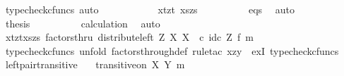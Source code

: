 \begin{isabellebody}
\ {\isacharparenleft}{\kern0pt}typecheck{\isacharunderscore}{\kern0pt}cfuncs{\isacharcomma}{\kern0pt}\ auto{\isacharparenright}{\kern0pt}\isanewline
\ \ \ \ \ \ \isamarkupfalse%
\ \isamarkupfalse%
\ {\isachardoublequoteopen}{\isachardot}{\kern0pt}{\isachardot}{\kern0pt}{\isachardot}{\kern0pt}\ {\isacharequal}{\kern0pt}\ {\isasymlangle}{\isasymlangle}xt{\isacharcomma}{\kern0pt}zt{\isasymrangle}{\isacharcomma}{\kern0pt}\ {\isasymlangle}xs{\isacharcomma}{\kern0pt}zs{\isasymrangle}{\isasymrangle}{\isachardoublequoteclose}\isanewline
\ \ \ \ \ \ \ \ \isamarkupfalse%
\ eqs\ \isamarkupfalse%
\ auto\isanewline
\ \ \ \ \ \ \isamarkupfalse%
\ \isamarkupfalse%
\ {\isacharquery}{\kern0pt}thesis\isanewline
\ \ \ \ \ \ \ \ \isamarkupfalse%
\ calculation\ \isamarkupfalse%
\ auto\isanewline
\ \ \ \ \isamarkupfalse%
\isanewline
\ \ \ \ \isamarkupfalse%
\ \isamarkupfalse%
\ {\isachardoublequoteopen}{\isasymlangle}{\isasymlangle}xt{\isacharcomma}{\kern0pt}zt{\isasymrangle}{\isacharcomma}{\kern0pt}{\isasymlangle}xs{\isacharcomma}{\kern0pt}zs{\isasymrangle}{\isasymrangle}\ factorsthru\ {\isacharparenleft}{\kern0pt}distribute{\isacharunderscore}{\kern0pt}left\ Z\ X\ X\ \ {\isasymcirc}\isactrlsub c\ {\isacharparenleft}{\kern0pt}id\isactrlsub c\ Z\ {\isasymtimes}\isactrlsub f\ m{\isacharparenright}{\kern0pt}{\isacharparenright}{\kern0pt}{\isachardoublequoteclose}\isanewline
\ \ \ \ \ \ \isamarkupfalse%
\ {\isacharparenleft}{\kern0pt}typecheck{\isacharunderscore}{\kern0pt}cfuncs{\isacharcomma}{\kern0pt}\ unfold\ factors{\isacharunderscore}{\kern0pt}through{\isacharunderscore}{\kern0pt}def{}{\isacharcomma}{\kern0pt}\ rule{\isacharunderscore}{\kern0pt}tac\ x{\isacharequal}{\kern0pt}{\isachardoublequoteopen}{\isasymlangle}z{\isacharcomma}{\kern0pt}y{\isacharprime}{\kern0pt}{\isasymrangle}{\isachardoublequoteclose}\ \ exI{\isacharcomma}{\kern0pt}\ typecheck{\isacharunderscore}{\kern0pt}cfuncs{\isacharparenright}{\kern0pt}\isanewline
\ \ \isamarkupfalse%
\isanewline
{}\isamarkupfalse%
%
\endisatagproof
{\isafoldproof}%
%
\isadelimproof
\isanewline
%
\endisadelimproof
\isanewline
{}\isamarkupfalse%
\ left{\isacharunderscore}{\kern0pt}pair{\isacharunderscore}{\kern0pt}transitive{\isacharcolon}{\kern0pt}\isanewline
\ \ \ {\isachardoublequoteopen}transitive{\isacharunderscore}{\kern0pt}on\ X\ {\isacharparenleft}{\kern0pt}Y{\isacharcomma}{\kern0pt}\ m{\isacharparenright}{\kern0pt}{\isachardoublequoteclose}\isanewline

\end{isabellebody}
